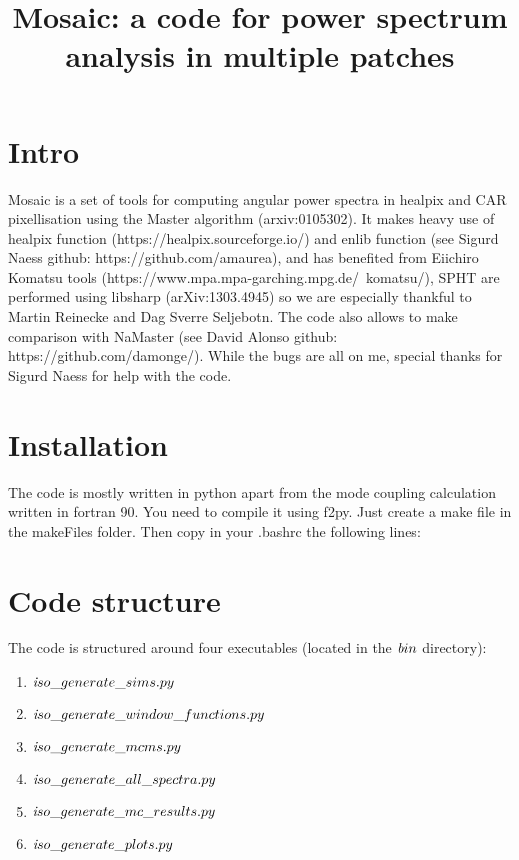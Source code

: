 \documentclass[a4paper, 11pt]{article}
\begin{document}
\title{Mosaic: a code for power spectrum analysis in multiple patches}
\maketitle

\section{Intro}

Mosaic is a set of tools for computing angular power spectra in healpix and CAR pixellisation using the Master algorithm (arxiv:0105302).
It makes heavy use of healpix function (https://healpix.sourceforge.io/) and enlib function (see Sigurd Naess github: https://github.com/amaurea), and has benefited from Eiichiro Komatsu tools (https://www.mpa.mpa-garching.mpg.de/~komatsu/), SPHT are performed using libsharp (arXiv:1303.4945) so we are especially thankful to Martin Reinecke and Dag Sverre Seljebotn.
The code also allows to make comparison with NaMaster (see David Alonso github: https://github.com/damonge/).
While the bugs are all on me, special thanks for Sigurd Naess for help with the code.

\section{Installation}

The code is mostly written in python apart from the mode coupling calculation written in fortran 90. You need to compile it using f2py. 
Just create a make file in the makeFiles folder.
Then copy in your .bashrc the following lines:



\section{Code structure}

The code is structured around four executables (located in the ${\textit bin} $ directory): 
\begin{enumerate}
\item ${\textit  iso\_generate\_sims.py }$
\item ${\textit  iso\_generate\_window\_functions.py }$
\item ${\textit  iso\_generate\_mcms.py  }$
\item ${\textit  iso\_generate\_all\_spectra.py  }$
\item ${\textit  iso\_generate\_mc\_results.py  } $
\item ${\textit  iso\_generate\_plots.py  } $
\end{enumerate}
\end{document}

